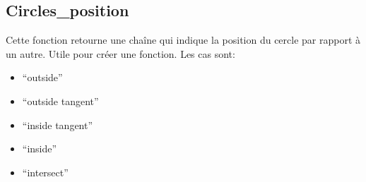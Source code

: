 \begin{enumerate}[label=(\roman*)]
\begin{itemize}
\begin{minipage}{.6\textwidth}
\end{minipage}
\end{itemize}
\end{enumerate}


\subsection{Circles\_position} %
\label{sub:circles_position}

Cette fonction retourne une chaîne qui indique la position du cercle par rapport à un autre. Utile pour créer une fonction. Les cas sont:

\begin{itemize}
   \item “outside”
   \item “outside tangent”
   \item “inside tangent”
   \item “inside”
   \item “intersect”
\end{itemize}


